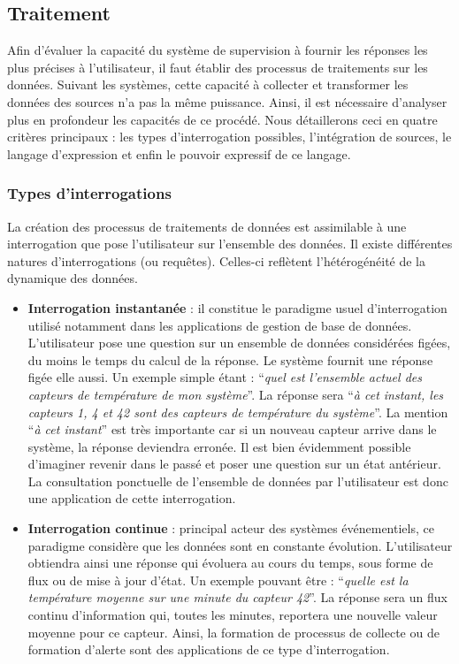 \subsection{Traitement}
Afin d'évaluer la capacité du système de supervision à fournir les réponses les plus précises à l'utilisateur, il faut établir des processus de traitements sur les données. Suivant les systèmes, cette capacité à collecter et transformer les données des sources n'a pas la même puissance. Ainsi, il est nécessaire d'analyser plus en profondeur les capacités de ce procédé. Nous détaillerons ceci en quatre critères principaux : les types d'interrogation possibles, l'intégration de sources, le langage d'expression et enfin le pouvoir expressif de ce langage.

\subsubsection{Types d'interrogations}
La création des processus de traitements de données est assimilable à une interrogation que pose l'utilisateur sur l'ensemble des données. Il existe différentes natures d'interrogations (ou requêtes). Celles-ci reflètent l'hétérogénéité de la dynamique des données.
\begin{itemize}
    \item \textbf{Interrogation instantanée} : il constitue le paradigme usuel d'interrogation utilisé notamment dans les applications de gestion de base de données. L'utilisateur pose une question sur un ensemble de données considérées figées, du moins le temps du calcul de la réponse. Le système fournit une réponse figée elle aussi. Un exemple simple étant : \enquote{\it quel est l'ensemble actuel des capteurs de température de mon système}. La réponse sera \enquote{\it à cet instant, les capteurs 1, 4 et 42 sont des capteurs de température du système}. La mention \enquote{\it à cet instant} est très importante car si un nouveau capteur arrive dans le système, la réponse deviendra erronée. Il est bien évidemment possible d'imaginer revenir dans le passé et poser une question sur un état antérieur. La consultation ponctuelle de l'ensemble de données par l'utilisateur est donc une application de cette interrogation.
    \item \textbf{Interrogation continue} : principal acteur des systèmes événementiels, ce paradigme considère que les données sont en constante évolution. L'utilisateur obtiendra ainsi une réponse qui évoluera au cours du temps, sous forme de flux ou de mise à jour d'état. Un exemple pouvant être : \enquote{\it quelle est la température moyenne sur une minute du capteur 42}. La réponse sera un flux continu d'information qui, toutes les minutes, reportera une nouvelle valeur moyenne pour ce capteur. Ainsi, la formation de processus de collecte ou de formation d'alerte sont des applications de ce type d'interrogation.
\end{itemize}
